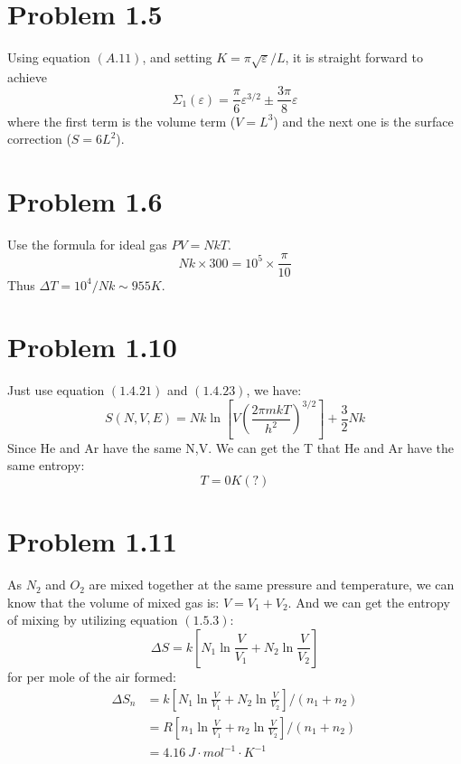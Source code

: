 \documentclass{article}
\begin{document}
\section*{Problem 1.5}
Using equation $(A.11)$, and setting $K = \pi \sqrt{\varepsilon}/L$, it is straight forward to achieve
\begin{equation}
\Sigma_{1}(\varepsilon) = \frac{\pi}{6}\varepsilon^{3/2} \pm \frac{3 \pi}{8} \varepsilon
\end{equation}
where the first term is the volume term ($V=L^{3}$) and the next one is the surface correction ($S=6L^{2}$).



\section*{Problem 1.6}
Use the formula for ideal gas $PV=NkT$.
\begin{equation}
N k \times 300= 10^{5} \times \frac{\pi}{10}
\end{equation}
Thus $\Delta T = 10^{4}/Nk \sim 955 K$.

\section*{Problem 1.10}
    Just use equation $(1.4.21)$ and $(1.4.23)$, we have:
    \begin{equation}
        S(N,V,E)=Nk\ln \left[V\left(\frac{2\pi m k T}{h^2}\right)^{3/2}\right]+\frac{3}{2}Nk
    \end{equation}
    Since He and Ar have the same N,V. We can get the T that He and Ar have the same entropy:
    $$
        T=0K (?)
    $$
\section*{Problem 1.11}
    As $N_2$ and $O_2$ are mixed together at the same pressure and temperature, we can know that the volume of mixed gas is: $V=V_1+V_2$. And we can get the entropy of mixing by utilizing equation $(1.5.3)$:
    \begin{equation}
        \Delta S=k \left[N_1 \ln\frac{V}{V_1}+N_2 \ln\frac{V}{V_2}\right]
    \end{equation}
    for per mole of the air formed:
    \begin{equation}
        \begin{aligned}
            \Delta S_n&=k \left[N_1 \ln\frac{V}{V_1}+N_2 \ln\frac{V}{V_2}\right]/(n_1+n_2)\\
                    &=R \left[n_1 \ln\frac{V}{V_1}+n_2 \ln\frac{V}{V_2}\right]/(n_1+n_2)\\
                    &=4.16~J\cdot mol^{-1}\cdot K^{-1}\\
        \end{aligned}
    \end{equation}
\end{document}
